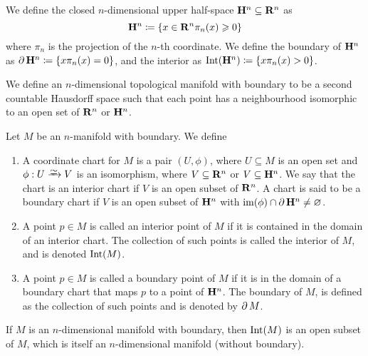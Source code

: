 \begin{definition}\label{def:upper-half-space}
We define the closed \(n\)-dimensional upper half-space \(\mathbf{H}^n \subseteq
\mathbf{R}^n\) as
\[
  \mathbf{H}^n \coloneq \{x \in \mathbf{R}^n \relax \pi_n(x) \geqslant 0\}
\]
where \(\pi_n\) is the projection of the \(n\)-th coordinate. We define the
boundary of \(\mathbf{H}^n\) as \(\operatorname{\partial} \mathbf{H}^n \coloneq \{x \relax \pi_n(x) = 0\}\),
and the interior as \(\operatorname{Int}(\mathbf{H}^n) \coloneq \{x \relax \pi_n(x) > 0\}\).
\end{definition}

\begin{definition}
\label{def: manifold with boundary}
We define an \(n\)-dimensional topological manifold with boundary to be a
second countable Hausdorff space such that each point has a neighbourhood
isomorphic to an open set of \(\mathbf{R}^n\) or \(\mathbf{H}^n\).
\end{definition}

\begin{definition}[Miscellaneous]
Let \(M\) be an \(n\)-manifold with boundary. We define
\begin{enumerate}[(MB1)]
  \item A coordinate chart for \(M\) is a pair \((U, \phi)\), where \(U
    \subseteq M\) is an open set and \(\phi: U \isoto V\) is an isomorphism,
    where \(V \subseteq \mathbf{R}^n\) or \(V \subseteq \mathbf{H}^n\). We say that the chart
    is an interior chart if \(V\) is an open subset of \(\mathbf{R}^n\). A chart is said
    to be a boundary chart if \(V\) is an open subset of \(\mathbf{H}^n\) with
    \(\operatorname{im}(\phi) \cap \operatorname{\partial} \mathbf{H}^n \neq \varnothing\).
  \item A point \(p \in M\) is called an interior point of \(M\) if it is
    contained in the domain of an interior chart. The collection of such
    points is called the interior of \(M\), and is denoted \(\operatorname{Int}(M)\).
  \item A point \(p \in M\) is called a boundary point of \(M\) if it is in
    the domain of a boundary chart that maps \(p\) to a point of
    \(\mathbf{H}^n\). The boundary of \(M\), is defined as the collection of
    such points and is denoted by \(\operatorname{\partial} M\).
\end{enumerate}
\end{definition}

\begin{proposition}\label{prop: interior is a manifold}
If \(M\) is an \(n\)-dimensional manifold with boundary, then \(\operatorname{Int}(M)\) is
an open subset of \(M\), which is itself an \(n\)-dimensional manifold
(without boundary).
\end{proposition}

